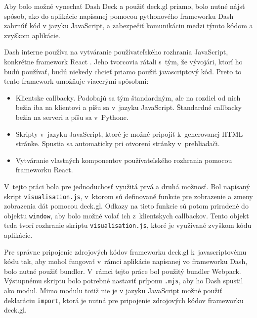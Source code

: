 Aby bolo možné vynechať Dash Deck a použiť deck.gl priamo, bolo nutné nájsť spôsob, ako do aplikácie napísanej pomocou pythonového frameworku Dash zahrnúť kód v jazyku JavaScript, a zabezpečiť komunikáciu medzi týmto kódom a zvyškom aplikácie.

Dash interne používa na vytváranie používateľského rozhrania JavaScript, konkrétne framework React \cite{dash_documentation}. Jeho tvorcovia rátali s~tým, že vývojári, ktorí ho budú používať, budú niekedy chcieť priamo použiť javascriptový kód. Preto to tento framework umožňuje viacerými spôsobmi:

\begin{itemize}
    \item Klientske callbacky. Podobajú sa tým štandardným, ale na rozdiel od nich bežia iba na klientovi a píšu sa v~jazyku JavaScript. Štandardné callbacky bežia na serveri a píšu sa v~Pythone.
    \item Skripty v~jazyku JavaScript, ktoré je možné pripojiť k~generovanej HTML stránke. Spustia sa automaticky pri otvorení stránky v~prehliadači.
    \item Vytváranie vlastných komponentov používateľského rozhrania pomocou frameworku React.
\end{itemize}

V~tejto práci bola pre jednoduchosť využitá prvá a druhá možnosť. Bol napísaný skript \texttt{visualisation.js}, v~ktorom sú definované funkcie pre zobrazenie a zmeny zobrazenia dát pomocou deck.gl. Odkazy na tieto funkcie sú potom priradené do objektu \texttt{window}, aby bolo možné volať ich z~klientskych callbackov. Tento objekt teda tvorí rozhranie skriptu \texttt{visualisation.js}, ktoré je využívané zvyškom kódu aplikácie.

Pre správne pripojenie zdrojových kódov frameworku deck.gl k~javascriptovému kódu tak, aby mohol fungovať v~rámci aplikácie napísanej vo frameworku Dash, bolo nutné použiť bundler. V~rámci tejto práce bol použitý bundler Webpack. Výstupnému skriptu bolo potrebné nastaviť príponu \texttt{.mjs}, aby ho Dash spustil ako modul. Mimo modulu totiž nie je v jazyku JavaScript možné použiť deklaráciu \texttt{import}, ktorá je nutná pre pripojenie zdrojových kódov frameworku deck.gl.

